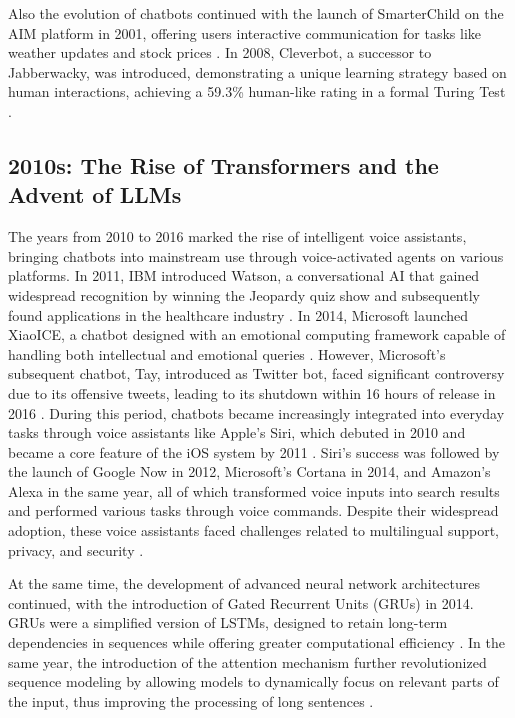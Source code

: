 Also the evolution of chatbots continued with the launch of SmarterChild on the AIM platform in 2001, offering users interactive communication for tasks like weather updates and stock prices \cite{adamopoulou2020chatbots}. In 2008, Cleverbot, a successor to Jabberwacky, was introduced, demonstrating a unique learning strategy based on human interactions, achieving a 59.3\% human-like rating in a formal Turing Test \cite{wikipedia2023cleverbot}.

\subsection{2010s: The Rise of Transformers and the Advent of LLMs}

The years from 2010 to 2016 marked the rise of intelligent voice assistants, bringing chatbots into mainstream use through voice-activated agents on various platforms. In 2011, IBM introduced Watson, a conversational AI that gained widespread recognition by winning the Jeopardy quiz show and subsequently found applications in the healthcare industry \cite{chen2016ibm}. In 2014, Microsoft launched XiaoICE, a chatbot designed with an emotional computing framework capable of handling both intellectual and emotional queries \cite{zhou2020design}. However, Microsoft's subsequent chatbot, Tay, introduced as Twitter bot, faced significant controversy due to its offensive tweets, leading to its shutdown within 16 hours of release in 2016 \cite{hoy2018alexa}. During this period, chatbots became increasingly integrated into everyday tasks through voice assistants like Apple's Siri, which debuted in 2010 and became a core feature of the iOS system by 2011 \cite{aron2011innovative}. Siri's success was followed by the launch of Google Now in 2012, Microsoft's Cortana in 2014, and Amazon's Alexa in the same year, all of which transformed voice inputs into search results and performed various tasks through voice commands. Despite their widespread adoption, these voice assistants faced challenges related to multilingual support, privacy, and security \cite{bolton2021security}.

At the same time, the development of advanced neural network architectures continued, with the introduction of Gated Recurrent Units (GRUs) in 2014. GRUs were a simplified version of LSTMs, designed to retain long-term dependencies in sequences while offering greater computational efficiency \cite{cho2014learning}. In the same year, the introduction of the attention mechanism further revolutionized sequence modeling by allowing models to dynamically focus on relevant parts of the input, thus improving the processing of long sentences \cite{bahdanau2014neural}.

